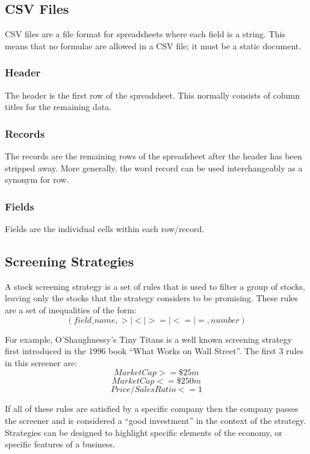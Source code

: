 \subsection{CSV Files}
CSV files are a file format for spreadsheets where each field is a string. This means that no formulae are allowed in a CSV file; it must be a static document.

\subsubsection{Header}
The header is the first row of the spreadsheet. This normally consists of column titles for the remaining data.

\subsubsection{Records}
The records are the remaining rows of the spreadsheet after the header has been stripped away. More generally, the word record can be used interchangeably as a synonym for row.

\subsubsection{Fields}
Fields are the individual cells within each row/record.

\subsection{Screening Strategies}
A stock screening strategy is a set of rules that is used to filter a group of stocks, leaving only the stocks that the strategy considers to be promising. These rules are a set of inequalities of the form: \vspace{-2mm}
\begin{equation}
    (field\_name, > | < | >= | <= | = , number)
\end{equation}

For example, O’Shaughnessy’s Tiny Titans is a well known screening strategy first introduced in the 1996 book ``What Works on Wall Street''. \cite{tinyTitans} The first 3 rules in this screener are:
\vspace{-3mm}
\begin{equation}
    Market Cap >= \$25m
\end{equation}
\vspace{-7mm}
\begin{equation}
    Market Cap <= \$250m
\end{equation}
\vspace{-5mm}
\begin{equation}
    Price/Sales Ratio <= 1
\end{equation}

If all of these rules are satisfied by a specific company then the company passes the screener and is considered a ``good investment'' in the context of the strategy. Strategies can be designed to highlight specific elements of the economy, or specific features of a business.